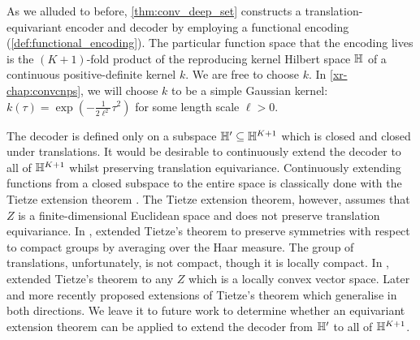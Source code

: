 \documentclass[12pt, twoside]{report}
\newcommand{\xrprefix}[1]{xr-#1}
\begin{document}
As we alluded to before, \cref{thm:conv_deep_set} constructs a translation-equivariant encoder and decoder by employing a functional encoding (\cref{def:functional_encoding}).
The particular function space that the encoding lives is the $(K+1)$-fold product of the reproducing kernel Hilbert space $\mathbb{H}$ of a continuous positive-definite kernel $k$.
We are free to choose $k$.
In \cref{\xrprefix{chap:convcnps}}, we will choose $k$ to be a simple Gaussian kernel: 
$k(\tau) = \exp(-\frac{1}{2\ell^2}\tau^2)$ for some length scale $\ell > 0$.

The decoder is defined only on a subspace $\mathbb{H}' \subseteq \mathbb{H}^{K+1}$ which is closed and closed under translations.
It would be desirable to continuously extend the decoder to all of $\mathbb{H}^{K+1}$ whilst preserving translation equivariance.
Continuously extending functions from a closed subspace to the entire space is classically done with the Tietze extension theorem \parencite[Theorem 35.1;][]{Munkres:2000:Topology}.
The Tietze extension theorem, however, assumes that $Z$ is a finite-dimensional Euclidean space and does not preserve translation equivariance.
In \citeyear{Gleason:1950:Spaces_With_a_Compact_Lie}, \citeauthor{Gleason:1950:Spaces_With_a_Compact_Lie} extended Tietze's theorem to preserve symmetries with respect to compact groups by averaging over the Haar measure.
The group of translations, unfortunately, is not compact, though it is locally compact.
In \citeyear{Dugundji:1951:An_Extension_of_Tietzes_Theorem},
\citeauthor{Dugundji:1951:An_Extension_of_Tietzes_Theorem} extended Tietze's theorem to any $Z$ which is a locally convex vector space.
Later \textcite{Jaworowski:1981:An_Equivariant_Extension_Theorem_and} and more recently \textcite{Feragen:2006:Characterization_of_Equivariant_ANEs} proposed extensions of Tietze's theorem which generalise in both directions.
We leave it to future work to determine whether an equivariant extension theorem can be applied to extend the decoder from $\mathbb{H}'$ to all of $\mathbb{H}^{K+1}$.
\end{document}
